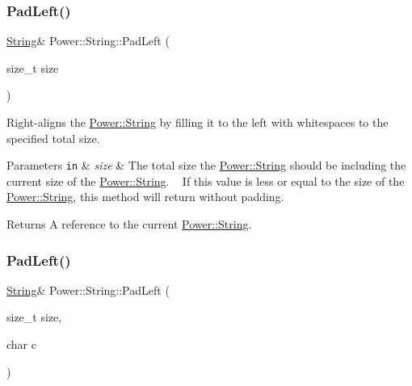 \subsubsection{\texorpdfstring{Pad\+Left()}{PadLeft()}\hspace{0.1cm}{\footnotesize\ttfamily [1/2]}}
{\footnotesize\ttfamily \hyperlink{class_power_1_1_string}{String}\& Power\+::\+String\+::\+Pad\+Left (\begin{DoxyParamCaption}\item[{size\+\_\+t}]{size }\end{DoxyParamCaption})\hspace{0.3cm}{\ttfamily [inline]}}



Right-\/aligns the \hyperlink{class_power_1_1_string}{Power\+::\+String} by filling it to the left with whitespaces to the specified total size. 


\begin{DoxyParams}[1]{Parameters}
\mbox{\tt in}  & {\em size} & The total size the \hyperlink{class_power_1_1_string}{Power\+::\+String} should be including the current size of the \hyperlink{class_power_1_1_string}{Power\+::\+String}. ~\newline
 If this value is less or equal to the size of the \hyperlink{class_power_1_1_string}{Power\+::\+String}, this method will return without padding. \\
\hline
\end{DoxyParams}
\begin{DoxyReturn}{Returns}
A reference to the current \hyperlink{class_power_1_1_string}{Power\+::\+String}. 
\end{DoxyReturn}
\mbox{\label{class_power_1_1_string_a7aace8f1a3e6daa76dcf38f0fdc6947d}} 
\subsubsection{\texorpdfstring{Pad\+Left()}{PadLeft()}\hspace{0.1cm}{\footnotesize\ttfamily [2/2]}}
{\footnotesize\ttfamily \hyperlink{class_power_1_1_string}{String}\& Power\+::\+String\+::\+Pad\+Left (\begin{DoxyParamCaption}\item[{size\+\_\+t}]{size,  }\item[{char}]{c }\end{DoxyParamCaption})\hspace{0.3cm}{\ttfamily [inline]}}



